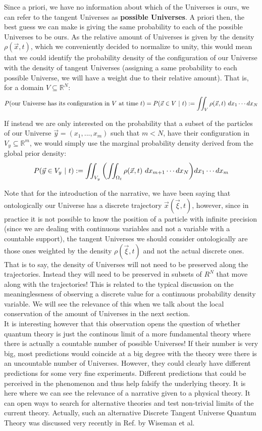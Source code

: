 \documentclass[11pt, a4paper]{article} %
\newcommand{\R}{\mathbb{R}} %
\DeclareRobustCommand{\mybox}[2][gray!10]{%
\begin{tcolorbox}[   %
        left=0.2cm,
        right=0.2cm,
        top=0.15cm,
        bottom=0.15cm,
        colback=#1,
        colframe=#1,
        width=\dimexpr\textwidth\relax, 
        enlarge left by=0mm,
        boxsep=5pt,
        arc=0pt,outer arc=0pt,
        ]
        #2
\end{tcolorbox}
}
\begin{document}
Since a priori, we have no information about which of the Universes is ours, we can refer to the tangent Universes as {\bf possible Universes}. A priori then, the best guess we can make is giving the same probability to each of the possible Universes to be ours. As the relative amount of Universes is given by the density $\rho(\vec{x},t)$, which we conveniently decided to normalize to unity, this would mean that we could identify the probability density of the configuration of our Universe with the density of tangent Universes (assigning a same probability to each possible Universe, we will have a weight due to their relative amount). That is, for a domain $V\subseteq \R^N$:
\begin{equation}
P\qty(\text{our Universe has its configuration in }V\text{ at time }t)=P(\vec{x}\in V\ |\ t) := \iint_{V}\rho(\vec{x},t)\ dx_1\cdots dx_N
\end{equation}

If instead we are only interested on the probability that a subset of the particles of our Universe $\vec{y}=(x_1,...,x_m)$ such that $m<N$, have their configuration in $V_y\subseteq \R^m$, we would simply use the marginal probability density derived from the global prior density:
$$
P(\vec{y}\in V_y\ |\ t) := \iint_{V_y}\qty(\iint_{\Omega_t}\rho(\vec{x},t)\ dx_{m+1}\cdots dx_N)dx_1\cdots dx_m
$$
\mybox{
Note that for the introduction of the narrative, we have been saying that ontologically our Universe has a discrete trajectory $\vec{x}(\vec{\xi},t)$, however, since in practice it is not possible to know the position of a particle with infinite precision (since we are dealing with continuous variables and not a variable with a countable support), the tangent Universes we should consider ontologically are those ones weighted by the density $\rho(\vec{\xi},t)$ and not the actual discrete ones. That is to say, the density of Universes will not need to be preserved along the trajectories. Instead they will need to be preserved in subsets of $R^N$ that move along with the trajectories! This is related to the typical discussion on the meaninglessness of observing a discrete value for a continuous probability density variable. We will see the relevance of this when we talk about the local conservation of the amount of Universes in the next section.\\

It is interesting however that this observation opens the question of whether quantum theory is just the continous limit of a more fundamental theory where there is actually a countable number of possible Universes! If their number is very big, most predictions would coincide at a big degree with the theory were there is an uncountable number of Universes. However, they could clearly have different predictions for some very fine experiments. Different predictions that could be perceived in the phenomenon and thus help falsify the underlying theory. It is here where we can see the relevance of a narrative given to a physical theory. It can open ways to search for alternative theories and test non-trivial limits of the current theory. Actually, such an alternative Discrete Tangent Universe Quantum Theory was discussed very recently in Ref. \cite{TangentWiseman} by Wiseman et al.
}
\end{document}
